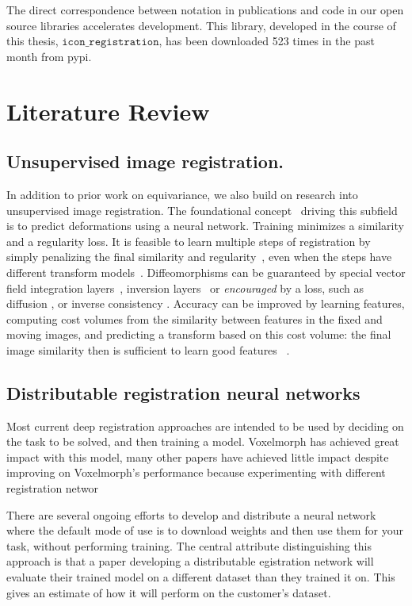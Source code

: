 \documentclass{article}
\begin{document}
The direct correspondence between notation in publications and code in our open source libraries accelerates development. This library, developed in the course of this thesis, $\texttt{icon\_registration}$, has been downloaded 523 times in the past month from pypi.


\section{Literature Review}

\subsection{Unsupervised image registration.}
In addition to prior work on equivariance, we also build on research into unsupervised image registration. The foundational concept~\cite{balakrishnan2019voxelmorph} driving this subfield is to predict deformations using a neural network. Training minimizes a similarity and a regularity loss. It is feasible to learn multiple steps of registration by simply penalizing the final similarity and regularity~\cite{shen2019networks, greer2021icon, tian2022}, even when the steps have different transform models~\cite{greer2023inverse, shen2019networks}. Diffeomorphisms can be guaranteed by special vector field integration layers~\cite{dalca2018unsupervised}, inversion layers~\cite{asymreg} or \emph{encouraged} by a loss, such as diffusion \cite{balakrishnan2019voxelmorph, shen2019networks}, or inverse consistency \cite{greer2021icon, tian2022}. Accuracy can be improved by learning features, computing cost volumes from the similarity between features in the fixed and moving images, and predicting a transform based on this cost volume: the final image similarity then is sufficient to learn good features~
\cite{mok2020large}.

\subsection{Distributable registration neural networks}

Most current deep registration approaches are intended to be used by deciding on the task to be solved, and then training a model. Voxelmorph \cite{balakrishnan2019voxelmorph} has achieved great impact with this model, many other papers have achieved little impact despite improving on Voxelmorph's performance because experimenting with different registration networ

There are several ongoing efforts to develop and distribute a neural network where the default mode of use is to download weights and then use them for your task, without performing training. The central attribute distinguishing this approach is that a paper 
developing a distributable egistration network will evaluate their trained model on a different dataset than they trained it on. This gives an estimate of how it will perform on the customer's dataset.
\end{document}
